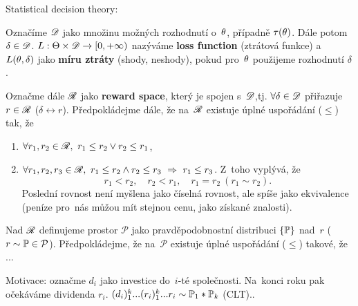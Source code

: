 Statistical decision theory:

\begin{define}
	Označíme $\mathscr{D}$ jako množinu možných rozhodnutí o~$\theta$, případně $\tau(\theta)$. Dále potom $\delta\in\mathscr{D}$. $L:\Theta\times\mathscr{D}\to[0,+\infty)$ nazýváme \textbf{loss function} (ztrátová funkce) a~$L(\theta,\delta)$ jako \textbf{míru ztráty} (shody, neshody), pokud pro~$\theta$ použijeme rozhodnutí $\delta$.
	
	Označme dále $\mathscr{R}$ jako \textbf{reward space}, který je spojen s~$\mathscr{D}$,tj. $\forall\delta\in\mathscr{D}$ přiřazuje $r\in\mathscr{R}$ ($\delta\leftrightarrow r$). Předpokládejme dále, že na~$\mathscr{R}$ existuje úplné uspořádání ($\leq$) tak, že \begin{enumerate}[A1)]
		\item $\forall r_1,r_2\in\mathscr{R},~r_1\leq r_2 \vee r_2\leq r_1$,
		\item $\forall r_1,r_2,r_3\in\mathscr{R},~r_1\leq r_2 \wedge r_2\leq r_3~\Rightarrow~r_1\leq r_3$. Z~toho vyplývá, že 
		$$ r_1<r_2,\quad r_2<r_1,\quad r_1=r_2~(r_1\sim r_2).$$
		Poslední rovnost není myšlena jako číselná rovnost, ale spíše jako ekvivalence (peníze pro~nás můžou mít stejnou cenu, jako získané znalosti).
	\end{enumerate}
Nad $\mathscr{R}$ definujeme prostor $\mathcal{P}$ jako pravděpodobnostní distribuci $\{\mathbb{P}\}$ nad~$r$ ($r\sim\mathbb{P}\in\mathcal{P}$). Předpokládejme, že na~$\mathcal{P}$ existuje úplné uspořádání ($\leq$) takové, že ...
\end{define}

Motivace: označme $d_i$ jako investice do~$i$-té společnosti. Na~konci roku pak očekáváme dividenda $r_i$. $(d_i)_1^k...(r_i)_1^k...r_i\sim \mathbb{P}_1\ast\mathbb{P}_k$ (CLT)..

